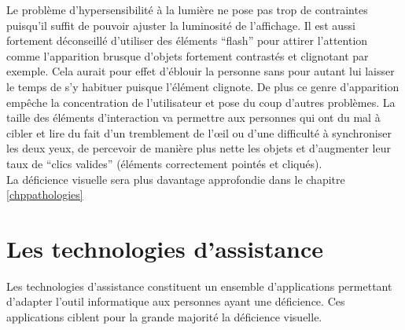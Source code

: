 \documentclass[french,a4paper]{report}
\begin{document}
\newline
Le problème d'hypersensibilité à la lumière ne pose pas trop de contraintes puisqu'il suffit de pouvoir ajuster la luminosité de l'affichage. Il est aussi fortement déconseillé d'utiliser des éléments \enquote{flash} pour attirer l'attention comme l'apparition brusque d'objets fortement contrastés et clignotant par exemple. Cela aurait pour effet d'éblouir la personne sans pour autant lui laisser le temps de s'y habituer puisque l'élément clignote. De plus ce genre d'apparition empêche la concentration de l'utilisateur et pose du coup d'autres problèmes.
\newline
La taille des éléments d'interaction va permettre aux personnes qui ont du mal à cibler
et lire du fait d'un tremblement de l'œil ou d'une difficulté à synchroniser les deux yeux,
de percevoir de manière plus nette les objets et d'augmenter leur taux de \enquote{clics valides}
(éléments correctement pointés et cliqués).\\
La déficience visuelle sera plus davantage approfondie dans le chapitre \ref{chppathologies}
\section{Les technologies d'assistance}
Les technologies d'assistance constituent un ensemble d'applications permettant d'adapter l'outil informatique aux personnes ayant une déficience. Ces applications ciblent pour la grande majorité la déficience visuelle.
\end{document}
